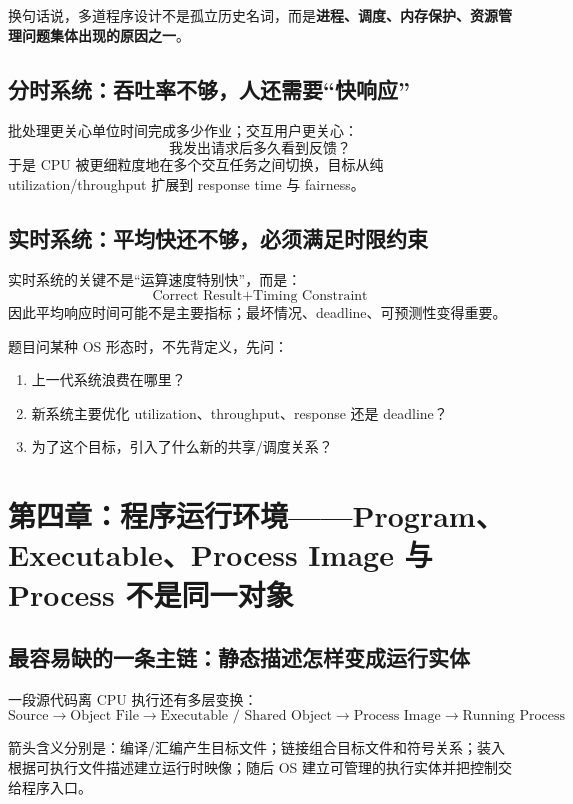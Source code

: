 \documentclass[11pt,a4paper]{ctexart}
\newcommand{\kw}[1]{\textbf{#1}}
\begin{document}
换句话说，多道程序设计不是孤立历史名词，而是\kw{进程、调度、内存保护、资源管理问题集体出现的原因之一}。

\subsection{分时系统：吞吐率不够，人还需要“快响应”}

批处理更关心单位时间完成多少作业；交互用户更关心：
\[
\boxed{\text{我发出请求后多久看到反馈？}}
\]
于是 CPU 被更细粒度地在多个交互任务之间切换，目标从纯 utilization/throughput 扩展到 response time 与 fairness。

\subsection{实时系统：平均快还不够，必须满足时限约束}

实时系统的关键不是“运算速度特别快”，而是：
\[
\boxed{\text{Correct Result} + \text{Timing Constraint}}
\]
因此平均响应时间可能不是主要指标；最坏情况、deadline、可预测性变得重要。

\begin{method}[历史题统一做法]
题目问某种 OS 形态时，不先背定义，先问：
\begin{enumerate}
  \item 上一代系统浪费在哪里？
  \item 新系统主要优化 utilization、throughput、response 还是 deadline？
  \item 为了这个目标，引入了什么新的共享/调度关系？
\end{enumerate}
\end{method}

\section{第四章：程序运行环境——Program、Executable、Process Image 与 Process 不是同一对象}

\subsection{最容易缺的一条主链：静态描述怎样变成运行实体}

一段源代码离 CPU 执行还有多层变换：
\[
\boxed{
\text{Source}
\rightarrow
\text{Object File}
\rightarrow
\text{Executable / Shared Object}
\rightarrow
\text{Process Image}
\rightarrow
\text{Running Process}
}
\]

箭头含义分别是：编译/汇编产生目标文件；链接组合目标文件和符号关系；装入根据可执行文件描述建立运行时映像；随后 OS 建立可管理的执行实体并把控制交给程序入口。
\end{document}

